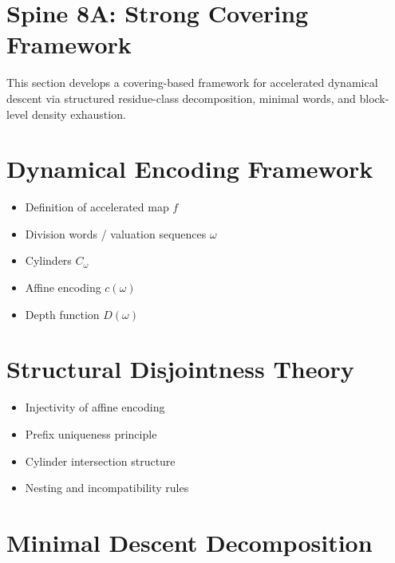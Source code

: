 \documentclass[12pt, oneside]{article}
\numberwithin{equation}{section}
\theoremstyle{definition}
\theoremstyle{plain}
\theoremstyle{remark}
\begin{document}

\section{Spine 8A: Strong Covering Framework}
\label{sec:spine-8a}

This section develops a covering-based framework for accelerated
dynamical descent via structured residue-class decomposition,
minimal words, and block-level density exhaustion.

\section{Dynamical Encoding Framework}
\label{sec:8a-dynamical-encoding}

\begin{itemize}
    \item Definition of accelerated map $f$
    \item Division words / valuation sequences $\omega$
    \item Cylinders $C_\omega$
    \item Affine encoding $c(\omega)$
    \item Depth function $D(\omega)$
\end{itemize}

\section{Structural Disjointness Theory}
\label{sec:8a-disjointness}

\begin{itemize}
    \item Injectivity of affine encoding
    \item Prefix uniqueness principle
    \item Cylinder intersection structure
    \item Nesting and incompatibility rules
\end{itemize}

\section{Minimal Descent Decomposition}
\label{sec:8a-minimal-descent}
\end{document}
